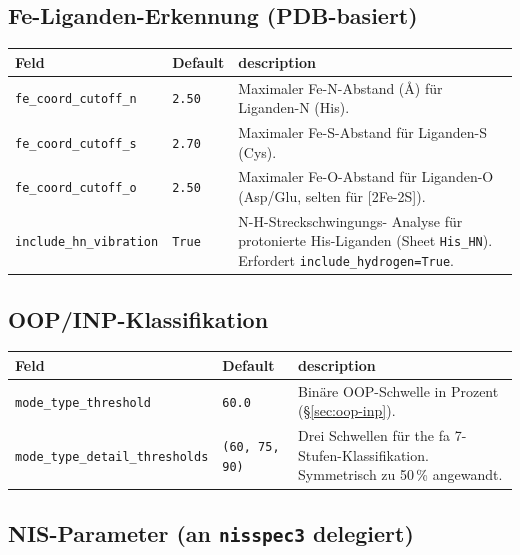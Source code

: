 \documentclass[11pt,a4paper,twoside]{article}
\theoremstyle{remark}
\begin{document}
\subsection{Fe-Liganden-Erkennung (PDB-basiert)}

\begin{longtable}{p{} p{} p{}}
\toprule
\textbf{Feld} & \textbf{Default} & \textbf{description} \\
\midrule
\endhead
\texttt{fe\_coord\_cutoff\_n} & \texttt{2.50} & Maximaler Fe-N-Abstand
  (\AA{}) f\"ur Liganden-N (His). \\
\texttt{fe\_coord\_cutoff\_s} & \texttt{2.70} & Maximaler Fe-S-Abstand
  f\"ur Liganden-S (Cys). \\
\texttt{fe\_coord\_cutoff\_o} & \texttt{2.50} & Maximaler Fe-O-Abstand
  f\"ur Liganden-O (Asp/Glu, selten f\"ur {[}2Fe-2S{]}). \\
\texttt{include\_hn\_vibration} & \texttt{True} & N-H-Streckschwingungs-
  Analyse f\"ur protonierte His-Liganden (Sheet \texttt{His\_HN}).
  Erfordert \texttt{include\_hydrogen=True}. \\
\bottomrule
\end{longtable}

\subsection{OOP/INP-Klassifikation}

\begin{longtable}{p{} p{} p{}}
\toprule
\textbf{Feld} & \textbf{Default} & \textbf{description} \\
\midrule
\endhead
\texttt{mode\_type\_threshold} & \texttt{60.0} & Bin\"are OOP-Schwelle in
  Prozent (\S\ref{sec:oop-inp}). \\
\texttt{mode\_type\_detail\_thresholds} & \texttt{(60, 75, 90)} & Drei
  Schwellen f\"ur the fa 7-Stufen-Klassifikation. Symmetrisch zu 50\,\%
  angewandt. \\
\bottomrule
\end{longtable}

\subsection{NIS-Parameter (an \texttt{nisspec3} delegiert)}
\end{document}
